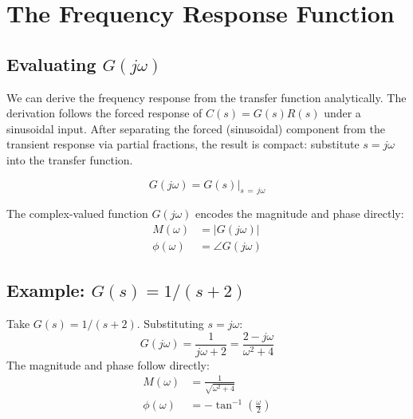 \documentclass[12pt]{article}
\begin{document}
\section{The Frequency Response Function}
\label{sec:G_jomega}

\subsection{Evaluating \texorpdfstring{$G(j\omega)$}{G(jω)}}
\label{sec:eval}

We can derive the frequency response from the transfer function analytically.
The derivation follows the forced response of $C(s) = G(s)R(s)$ under a
sinusoidal input.  After separating the forced (sinusoidal) component from the
transient response via partial fractions, the result is compact: substitute
$s = j\omega$ into the transfer function.

\begin{equation}
  \boxed{G(j\omega) = G(s)\big|_{s\,=\,j\omega}}
  \label{eq:G_jomega}
\end{equation}

The complex-valued function $G(j\omega)$ encodes the magnitude and phase
directly:
\begin{align}
  M(\omega) &= \bigl|G(j\omega)\bigr| \label{eq:magnitude} \\
  \phi(\omega) &= \angle G(j\omega) \label{eq:phase}
\end{align}

\subsection{Example: \texorpdfstring{$G(s) = 1/(s+2)$}{G(s) = 1/(s+2)}}
\label{sec:example_10_1}

Take $G(s) = 1/(s+2)$.  Substituting $s = j\omega$:
\begin{equation}
  G(j\omega) = \frac{1}{j\omega + 2} = \frac{2 - j\omega}{\omega^2 + 4}
  \label{eq:example_gjw}
\end{equation}
The magnitude and phase follow directly:
\begin{align}
  M(\omega) &= \frac{1}{\sqrt{\omega^2 + 4}} \label{eq:example_mag} \\[4pt]
  \phi(\omega) &= -\tan^{-1}\!\left(\frac{\omega}{2}\right) \label{eq:example_phase}
\end{align}
\end{document}
